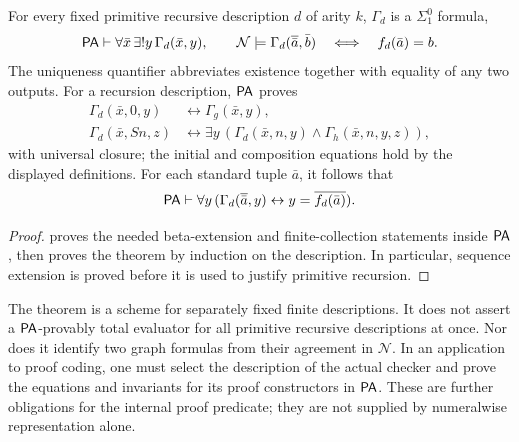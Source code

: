 \begin{theorem}
\label{thm:p05-pa-pr-graphs}
For every fixed primitive recursive description \(d\) of arity \(k\),
\(\Gamma_d\) is a \(\Sigma^0_1\) formula,
\[
 \mathsf{PA}\vdash\forall\bar x\,\exists!y\,\Gamma_d(\bar x,y),
 \qquad
 \mathcal N\models\Gamma_d(\overline{\bar a},\bar b)
       \quad\Longleftrightarrow\quad f_d(\bar a)=b.
\]
The uniqueness quantifier abbreviates existence together with equality of
any two outputs.  For a recursion description, \(\mathsf{PA}\) proves
\[
\begin{aligned}
 \Gamma_d(\bar x,0,y)&\leftrightarrow\Gamma_g(\bar x,y),\\
 \Gamma_d(\bar x,Sn,z)&\leftrightarrow
   \exists y\,(\Gamma_d(\bar x,n,y)\land\Gamma_h(\bar x,n,y,z)),
\end{aligned}
\]
with universal closure; the initial and composition equations hold by the
displayed definitions.  For each standard tuple \(\bar a\), it follows that
\[
 \mathsf{PA}\vdash\forall y\,
   (\Gamma_d(\overline{\bar a},y)
                     \leftrightarrow y=\overline{f_d(\bar a)}).
\]
\end{theorem}
\begin{proof}
 proves the needed beta-extension and
finite-collection statements inside \(\mathsf{PA}\), then proves the theorem by
induction on the description.  In particular, sequence extension is proved
before it is used to justify primitive recursion.
\end{proof}

The theorem is a scheme for separately fixed finite descriptions.  It does
not assert a \(\mathsf{PA}\)-provably total evaluator for all primitive recursive
descriptions at once.  Nor does it identify two graph formulas from their
agreement in \(\mathcal N\).  In an application to proof coding, one must
select the description of the actual checker and prove the equations and
invariants for its proof constructors in \(\mathsf{PA}\).  These are further
obligations for the internal proof predicate; they are not supplied by
numeralwise representation alone.

